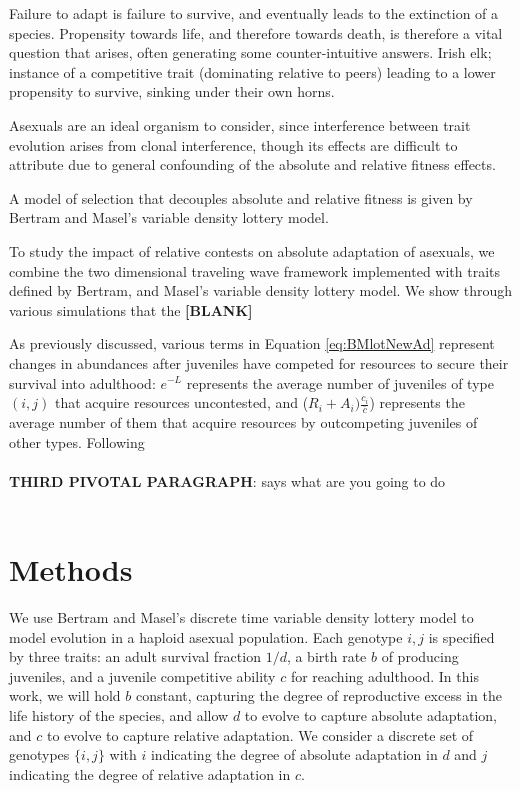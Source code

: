 \documentclass[9pt,twocolumn,twoside]{article}
\begin{document}
Failure to adapt is failure to survive, and eventually leads to the extinction of a species. Propensity towards life, and therefore towards death, is therefore a vital question that arises, often generating some counter-intuitive answers. Irish elk; instance of a competitive trait (dominating relative to peers) leading to a lower propensity to survive, sinking under their own horns.

Asexuals are an ideal organism to consider, since interference between trait evolution arises from clonal interference, though its effects are difficult to attribute due to general confounding of the absolute and relative fitness effects. 

A model of selection that decouples absolute and relative fitness is given by Bertram and Masel's \citep{bertram2019density} variable density lottery model.

To study the impact of relative contests on absolute adaptation of asexuals, we combine the two dimensional traveling wave framework implemented with traits defined by Bertram, and Masel's variable density lottery model. We show through various simulations that the \textbf{[BLANK]}

As previously discussed, various terms in Equation \eqref{eq:BMlotNewAd} represent changes in abundances after juveniles have competed for resources to secure their survival into adulthood: $e^{-L}$ represents the average number of juveniles of type $(i,j)$ that acquire resources uncontested, and ($R_i+ A_i) \frac{c_i}{\bar{c}}$) represents the average number of them that acquire resources by outcompeting juveniles of other types. Following
\\ \\ 
\textbf{THIRD PIVOTAL PARAGRAPH}: says what are you going to do
\\ \\

\section{Methods} \label{sec:methods}
We use Bertram and Masel's \citep{bertram2019density} discrete time variable density lottery model to model evolution in a haploid asexual population. Each genotype ${i,j}$ is specified by three traits:  an adult survival fraction $1/d$, a birth rate $b$ of producing juveniles, and a juvenile competitive ability $c$ for reaching adulthood. In this work, we will hold $b$ constant, capturing the degree of reproductive excess in the life history of the species, and allow $d$ to evolve to capture absolute adaptation, and $c$ to evolve to capture relative adaptation. We consider a discrete set of genotypes $\{i,j\}$ with $i$ indicating the degree of absolute adaptation in $d$ and $j$ indicating the degree of relative adaptation in $c$.
\end{document}
